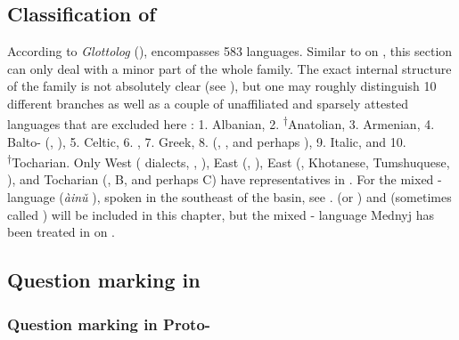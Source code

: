 \section{}\label{sec:5.5}
\subsection{Classification of }\label{sec:5.5.1}

According to \textit{Glottolog} (\citealt{Hammarström2016}),  encompasses 583 languages. Similar to  on , this section can only deal with a minor part of the whole  family. The exact internal  structure of the family is not absolutely clear (see ), but one may roughly distinguish 10 different branches as well as a couple of unaffiliated and sparsely attested languages that are excluded here \citep[10]{Fortson2010}: 1. Albanian, 2. \textsuperscript{†}Anatolian, 3. Armenian, 4. Balto- (, ), 5. Celtic, 6. , 7. Greek, 8.  (, , and perhaps ), 9. Italic, and 10. \textsuperscript{†}Tocharian. Only West  ( dialects, , ), East  (, ), East  (, Khotanese, Tumshuquese, ), and Tocharian (, B, and perhaps C) have representatives in . For the mixed - language  (\textit{àinǔ} ), spoken in the southeast of the  basin, see .  (or ) and  (sometimes called ) will be included in this chapter, but the mixed - language Mednyj  has been treated in  on .

\subsection{Question marking in }\label{sec:5.5.2}

\subsubsection{Question marking in Proto-}\label{sec:5.5.2.1}

